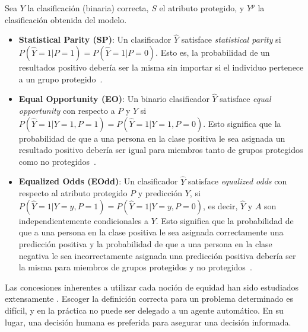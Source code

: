 
Sea $Y$ la clasificación (binaria) correcta, $S$ el atributo protegido, y $Y^p$ la clasificación obtenida del modelo.

 \begin{itemize}
     \item \textbf{Statistical Parity (SP)}: Un clasificador $\hat{Y}$ satisface \emph{statistical parity} si $P(\hat{Y}=1|P=1) = P(\hat{Y}=1|P=0)$.
     Esto es, la probabilidad de un resultados positivo debería ser la misma sin importar si el individuo pertenece a un grupo protegido~\parencite{verma2018fairness}.
     \item \textbf{Equal Opportunity (EO)}: Un binario clasificador $\hat{Y}$ satisface \emph{equal opportunity} con respecto a $P$ y $Y$ si $P(\hat{Y}=1|Y=1,P=1) = P(\hat{Y}=1|Y=1,P=0)$.
     Esto significa que la probabilidad de que a una persona en la clase positiva le sea asignada un resultado positivo debería ser igual para miembros tanto de grupos protegidos como no protegidos~\parencite{verma2018fairness}.
     \item \textbf{Equalized Odds (EOdd)}: Un clasificador $\hat{Y}$ satisface \emph{equalized odds} con respecto al atributo protegido $P$ y predicción $Y$, si $P(\hat{Y}=1|Y=y,P=1) = P(\hat{Y}=1|Y=y,P=0)$, es decir, $\hat{Y}$ y $A$ son independientemente condicionales a $Y$.
     Esto significa que la probabilidad de que a una persona en la clase positiva le sea asignada correctamente una predicción positiva y la probabilidad de que a una persona en la clase negativa le sea incorrectamente asignada una predicción positiva debería ser la misma para miembros de grupos protegidos y no protegidos~\cite{verma2018fairness}.
 \end{itemize}

Las concesiones inherentes a utilizar cada noción de equidad han sido estudiados extensamente \parencite{dwork2012fairness, friedler2016possibility, kleinberg2018inherent}.
Escoger la definición correcta para un problema determinado es difícil, y en la práctica no puede ser delegado a un agente automático.
En su lugar, una decisión humana es preferida para asegurar una decisión informada.

